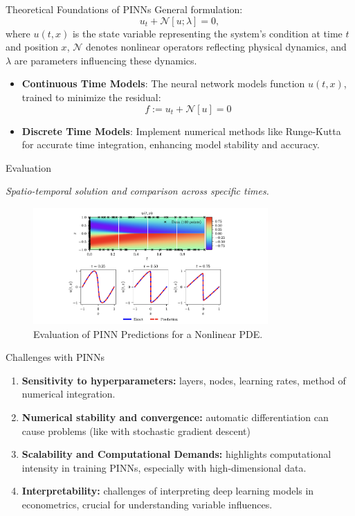 \begin{frame}{Theoretical Foundations of PINNs}
General formulation:
\[
u_t + \mathcal{N}[u; \lambda] = 0,
\]
where \( u(t, x) \) is the state variable representing the system's condition at time \( t \) and position \( x \), \( \mathcal{N} \) denotes nonlinear operators reflecting physical dynamics, and \( \lambda \) are parameters influencing these dynamics.
\begin{itemize}
  \item \textbf{Continuous Time Models}: The neural network models function \( u(t, x) \), trained to minimize the residual:
    \[
    f := u_t + \mathcal{N}[u] = 0
    \]
  \item \textbf{Discrete Time Models}: Implement numerical methods like Runge-Kutta for accurate time integration, enhancing model stability and accuracy.
\end{itemize}
\end{frame}

\begin{frame}{Evaluation}
\begin{block}{}
        \emph{Spatio-temporal solution and comparison across specific times.}
    \end{block}
\begin{figure}[H]
    \centering
    \includegraphics[width=0.8\textwidth]{img/Illustration2.png}
    \caption{Evaluation of PINN Predictions for a Nonlinear PDE.}
    \label{fig:Physics-Informed Neural Networks}
\end{figure} 
\end{frame}

\begin{frame}{Challenges with PINNs}
\begin{enumerate}
    \item \textbf{Sensitivity to hyperparameters:} layers, nodes, learning rates, method of numerical integration. 
    \item \textbf{Numerical stability and convergence:} automatic differentiation can cause problems (like with stochastic gradient descent)
    \item \textbf{Scalability and Computational Demands:} highlights computational intensity in training PINNs, especially with high-dimensional data.
    \item \textbf{Interpretability:} challenges of interpreting deep learning models in econometrics, crucial for understanding variable influences.
\end{enumerate}
\end{frame}

